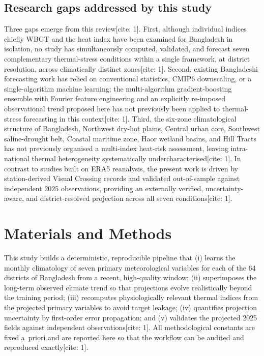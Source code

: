 \documentclass[pdflatex,sn-mathphys-ay]{sn-jnl}
\begin{document}
\subsection{Research gaps addressed by this study}
Three gaps emerge from this review[cite: 1]. First, although individual indices chiefly WBGT and the heat index have been examined for Bangladesh in isolation, no study has simultaneously computed, validated, and forecast seven complementary thermal-stress conditions within a single framework, at district resolution, across climatically distinct zones[cite: 1]. Second, existing Bangladeshi forecasting work has relied on conventional statistics, CMIP6 downscaling, or a single-algorithm machine learning; the multi-algorithm gradient-boosting ensemble with Fourier feature engineering and an explicitly re-imposed observational trend proposed here has not previously been applied to thermal-stress forecasting in this context[cite: 1]. Third, the six-zone climatological structure of Bangladesh, Northwest dry-hot plains, Central urban core, Southwest saline-drought belt, Coastal maritime zone, Haor wetland basins, and Hill Tracts has not previously organised a multi-index heat-risk assessment, leaving intra-national thermal heterogeneity systematically undercharacterised[cite: 1]. In contrast to studies built on ERA5 reanalysis, the present work is driven by station-derived Visual Crossing records and validated out-of-sample against independent 2025 observations, providing an externally verified, uncertainty-aware, and district-resolved projection across all seven conditions[cite: 1].

\section{Materials and Methods}\label{sec:methods}

This study builds a deterministic, reproducible pipeline that (i) learns the monthly climatology of seven primary meteorological variables for each of the 64 districts of Bangladesh from a recent, high-quality window; (ii) superimposes the long-term observed climate trend so that projections evolve realistically beyond the training period; (iii) recomputes physiologically relevant thermal indices from the projected primary variables to avoid target leakage; (iv) quantifies projection uncertainty by first-order error propagation; and (v) validates the projected 2025 fields against independent observations[cite: 1]. All methodological constants are fixed a~priori and are reported here so that the workflow can be audited and reproduced exactly[cite: 1].
\end{document}
